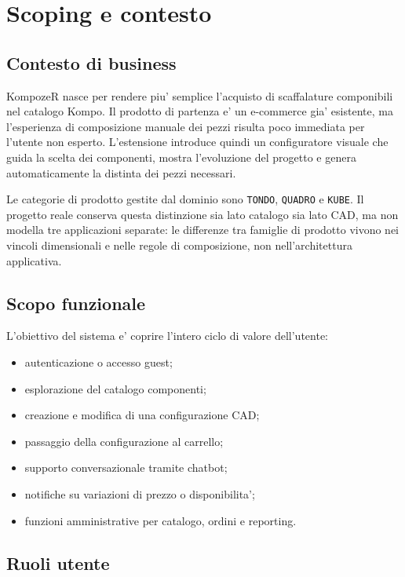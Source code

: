 \chapter{Scoping e contesto}

\section{Contesto di business}

KompozeR nasce per rendere piu' semplice l'acquisto di scaffalature componibili nel catalogo Kompo. Il prodotto di partenza e' un e-commerce gia' esistente, ma l'esperienza di composizione manuale dei pezzi risulta poco immediata per l'utente non esperto. L'estensione introduce quindi un configuratore visuale che guida la scelta dei componenti, mostra l'evoluzione del progetto e genera automaticamente la distinta dei pezzi necessari.

Le categorie di prodotto gestite dal dominio sono \texttt{TONDO}, \texttt{QUADRO} e \texttt{KUBE}. Il progetto reale conserva questa distinzione sia lato catalogo sia lato CAD, ma non modella tre applicazioni separate: le differenze tra famiglie di prodotto vivono nei vincoli dimensionali e nelle regole di composizione, non nell'architettura applicativa.

\section{Scopo funzionale}

L'obiettivo del sistema e' coprire l'intero ciclo di valore dell'utente:

\begin{itemize}
\item autenticazione o accesso guest;
\item esplorazione del catalogo componenti;
\item creazione e modifica di una configurazione CAD;
\item passaggio della configurazione al carrello;
\item supporto conversazionale tramite chatbot;
\item notifiche su variazioni di prezzo o disponibilita';
\item funzioni amministrative per catalogo, ordini e reporting.
\end{itemize}

\section{Ruoli utente}

